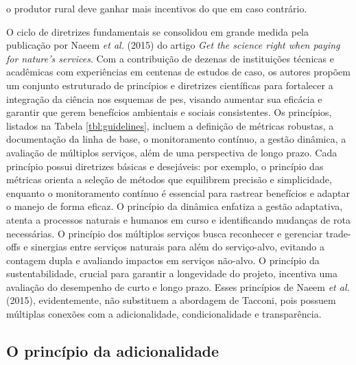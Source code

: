 \documentclass[./main.tex]{subfiles}
\begin{document}
o produtor rural deve ganhar mais incentivos do que em caso contrário.

\par O ciclo de diretrizes fundamentais se consolidou em grande medida pela publicação por Naeem \textit{et al.} (2015) \cite{Naeem2015b} do artigo \textit{Get the science right when paying for nature’s services}. Com a contribuição de dezenas de instituições técnicas e acadêmicas com experiências em centenas de estudos de caso, os autores propõem um conjunto estruturado de princípios e diretrizes científicas para fortalecer a integração da ciência nos esquemas de \acrshort{pes}, visando aumentar sua eficácia e garantir que gerem benefícios ambientais e sociais consistentes. Os princípios, listados na Tabela \ref{tbl:guidelines}, incluem a definição de métricas robustas, a documentação da linha de base, o monitoramento contínuo, a gestão dinâmica, a avaliação de múltiplos serviços, além de uma perspectiva de longo prazo. Cada princípio possui diretrizes básicas e desejáveis: por exemplo, o princípio das métricas orienta a seleção de métodos que equilibrem precisão e simplicidade, enquanto o monitoramento contínuo é essencial para rastrear benefícios e adaptar o manejo de forma eficaz. O princípio da dinâmica enfatiza a gestão adaptativa, atenta a processos naturais e humanos em curso e identificando mudanças de rota necessárias. O princípio dos múltiplos serviços busca reconhecer e gerenciar trade-offs e sinergias entre serviços naturais para além do serviço-alvo, evitando a contagem dupla e avaliando impactos em serviços não-alvo. O princípio da sustentabilidade, crucial para garantir a longevidade do projeto, incentiva uma avaliação do desempenho de curto e longo prazo. Esses princípios de Naeem \textit{et al.} (2015), evidentemente, não substituem a abordagem de Tacconi, pois possuem múltiplas conexões com a adicionalidade, condicionalidade e transparência. 

\subsection{O princípio da adicionalidade}
\end{document}
